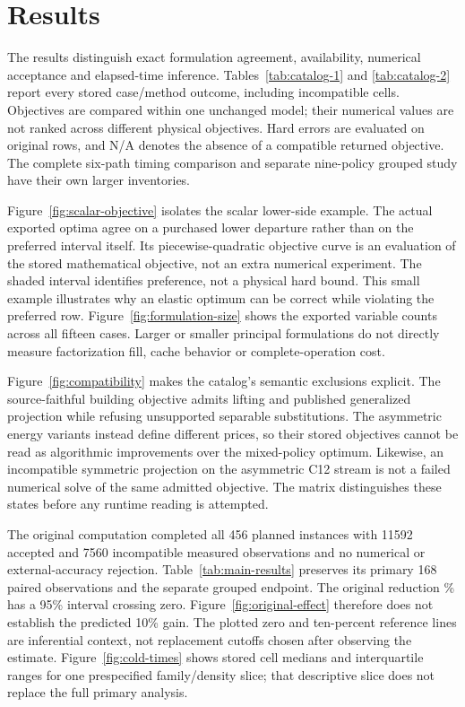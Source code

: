 \section{Results}\label{sec:results}
The results distinguish exact formulation agreement, availability, numerical
acceptance and elapsed-time inference. Tables~\ref{tab:catalog-1} and
\ref{tab:catalog-2} report every stored case/method outcome, including
incompatible cells. Objectives are compared within one unchanged model;
their numerical values are not ranked across different physical objectives.
Hard errors are evaluated on original rows, and N/A denotes the absence
of a compatible returned objective. The complete six-path timing comparison
and separate nine-policy grouped study have their own larger inventories.



Figure~\ref{fig:scalar-objective} isolates the scalar lower-side example.
The actual exported optima agree on a purchased lower departure rather than
on the preferred interval itself. Its piecewise-quadratic objective curve is an evaluation
of the stored mathematical objective, not an extra numerical experiment.
The shaded interval identifies preference, not a physical hard bound. This
small example illustrates why an elastic optimum can be correct while
violating the preferred row. Figure~\ref{fig:formulation-size} shows the
exported variable counts across all fifteen cases. Larger or smaller principal
formulations do not directly measure factorization fill, cache behavior or
complete-operation cost.



Figure~\ref{fig:compatibility} makes the catalog's semantic exclusions explicit.
The source-faithful building objective admits lifting and published generalized
projection while refusing unsupported separable substitutions. The asymmetric
energy variants instead define different prices, so their stored objectives
cannot be read as algorithmic improvements over the mixed-policy optimum.
Likewise, an incompatible symmetric projection on the asymmetric C12 stream
is not a failed numerical solve of the same admitted objective. The matrix
distinguishes these states before any runtime reading is attempted.


The original computation completed all 456 planned instances with 11592 accepted
and 7560 incompatible measured observations and no numerical or external-accuracy
rejection. Table~\ref{tab:main-results} preserves its primary 168 paired
observations and the separate grouped endpoint. The original reduction
\OriginalEstimate\% has a 95\% interval crossing zero. Figure~\ref{fig:original-effect}
therefore does not establish the predicted 10\% gain. The plotted zero and
ten-percent reference lines are inferential context, not replacement cutoffs
chosen after observing the estimate. Figure~\ref{fig:cold-times} shows stored
cell medians and interquartile ranges for one prespecified family/density
slice; that descriptive slice does not replace the full primary analysis.




